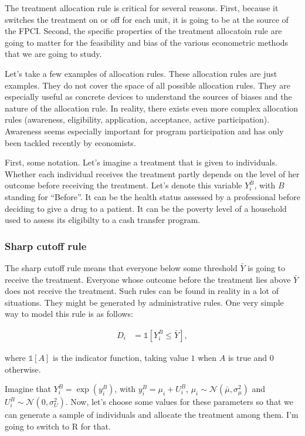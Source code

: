 \documentclass[]{book}
\newcommand{\uns}[1]{\mathds{1}[ #1 ]}
\theoremstyle{definition}
\theoremstyle{definition}
\theoremstyle{definition}
\theoremstyle{remark}
\let\BeginKnitrBlock\begin \let\EndKnitrBlock\end
\begin{document}
The treatment allocation rule is critical for several reasons.
First, because it switches the treatment on or off for each unit, it is going to be at the source of the FPCI.
Second, the specific properties of the treatment allocatoin rule are going to matter for the feasibility and bias of the various econometric methods that we are going to study.

Let's take a few examples of allocation rules.
These allocation rules are just examples.
They do not cover the space of all possible allocation rules.
They are especially useful as concrete devices to understand the sources of biases and the nature of the allocation rule.
In reality, there exists even more complex allocation rules (awareness, eligibility, application, acceptance, active participation).
Awareness seems especially important for program participation and has only been tackled recently by economists.

First, some notation.
Let's imagine a treatment that is given to individuals.
Whether each individual receives the treatment partly depends on the level of her outcome before receiving the treatment.
Let's denote this variable \(Y^B_i\), with \(B\) standing for ``Before''.
It can be the health status assessed by a professional before deciding to give a drug to a patient.
It can be the poverty level of a household used to assess its eligibilty to a cash transfer program.

\hypertarget{sharp-cutoff-rule}{%
\subsubsection{Sharp cutoff rule}\label{sharp-cutoff-rule}}

The sharp cutoff rule means that everyone below some threshold \(\bar{Y}\) is going to receive the treatment.
Everyone whose outcome before the treatment lies above \(\bar{Y}\) does not receive the treatment.
Such rules can be found in reality in a lot of situations.
They might be generated by administrative rules.
One very simple way to model this rule is as follows:

\begin{align}\label{eq:cutoff}
  D_i & = \uns{Y_i^B\leq\bar{Y}},
\end{align}

where \(\uns{A}\) is the indicator function, taking value \(1\) when \(A\) is true and \(0\) otherwise.

\BeginKnitrBlock{example}[Sharp cutoff rule]
\protect\hypertarget{exm:unnamed-chunk-1}{}{\label{exm:unnamed-chunk-1} \iffalse (Sharp cutoff rule) \fi{} }Imagine that \(Y_i^B=\exp(y_i^B)\), with \(y_i^B=\mu_i+U_i^B\), \(\mu_i\sim\mathcal{N}(\bar{\mu},\sigma^2_{\mu})\) and \(U_i^B\sim\mathcal{N}(0,\sigma^2_{U})\).
Now, let's choose some values for these parameters so that we can generate a sample of individuals and allocate the treatment among them.
I'm going to switch to R for that.
\EndKnitrBlock{example}
\end{document}
